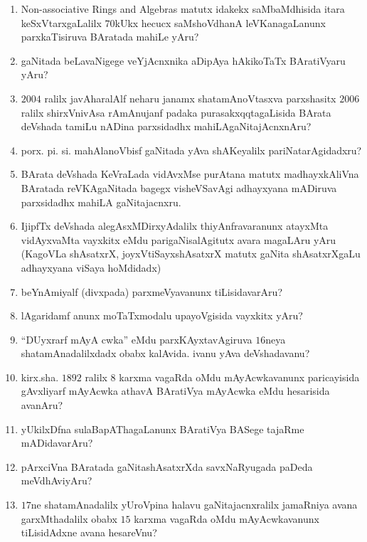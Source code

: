 \begin{enumerate}
\item {\rm Non-associative Rings and Algebras} matutx idakekx saMbaMdhisida itara keSxVtarxgaLalilx $70$kUkx hecucx saMshoVdhanA leVKanagaLanunx  parxkaTisiruva BAratada mahiLe yAru?
  
\item gaNitada beLavaNigege veYjAcnxnika aDipAya hAkikoTaTx BAratiVyaru yAru?
  
\item $2004$ ralilx javAharalAlf neharu janamx shatamAnoVtasxva parxshasitx $2006$ ralilx shirxVnivAsa rAmAnujanf padaka purasakxqqtagaLisida BArata deVshada tamiLu nADina parxsidadhx mahiLAgaNitajAcnxnAru?

\item porx. pi. si. mahAlanoVbisf gaNitada yAva shAKeyalilx pariNatarAgidadxru?
  
\item BArata deVshada KeVraLada vidAvxMse purAtana matutx madhayxkAliVna BAratada reVKAgaNitada bagegx visheVSavAgi adhayxyana mADiruva parxsidadhx mahiLA gaNitajacnxru.
  
\item IjipfTx deVshada alegAsxMDirxyAdalilx thiyAnfravaranunx atayxMta vidAyxvaMta vayxkitx eMdu parigaNisalAgitutx avara magaLAru yAru (KagoVLa shAsatxrX, joyxVtiSayxshAsatxrX matutx gaNita shAsatxrXgaLu adhayxyana viSaya hoMdidadx)
  
\item beYnAmiyalf (divxpada) parxmeVyavanunx tiLisidavarAru?
  
\item lAgaridamf anunx moTaTxmodalu upayoVgisida vayxkitx yAru?
  
\item ``DUyxrarf mAyA cwka'' eMdu parxKAyxtavAgiruva $16$neya shatamAnadalilxdadx obabx kalAvida. ivanu yAva deVshadavanu?
  
\item kirx.sha. $1892$ ralilx $8$ karxma vagaRda oMdu mAyAcwkavanunx paricayisida gAvxliyarf mAyAcwka athavA BAratiVya mAyAcwka eMdu hesarisida avanAru?

 
\item yUkilxDfna sulaBapAThagaLanunx BAratiVya BASege tajaRme mADidavarAru?

\item pArxciVna BAratada gaNitashAsatxrXda savxNaRyugada paDeda meVdhAviyAru?
  
\item $17$ne shatamAnadalilx yUroVpina halavu gaNitajacnxralilx jamaRniya avana garxMthadalilx obabx $15$ karxma vagaRda oMdu mAyAcwkavanunx tiLisidAdxne avana hesareVnu?
  

\end{enumerate}

